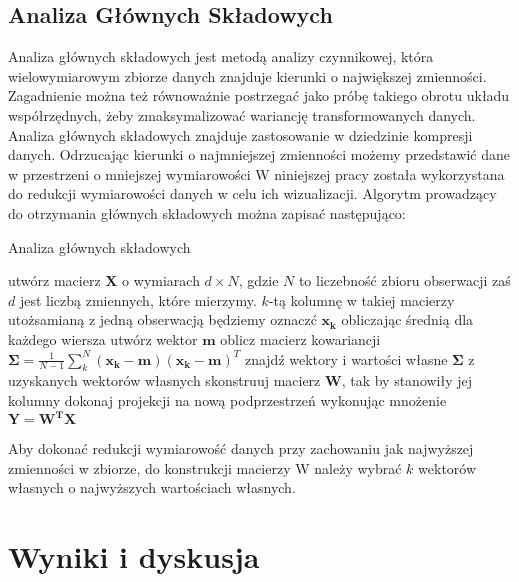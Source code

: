 \documentclass{article}
\begin{document}
\subsection{Analiza Głównych Składowych}
\label{pca_rozdzial}
Analiza głównych składowych jest metodą analizy czynnikowej, która wielowymiarowym zbiorze danych znajduje kierunki o największej zmienności.
Zagadnienie można też równoważnie postrzegać jako próbę takiego obrotu układu współrzędnych, żeby zmaksymalizować wariancję transformowanych danych.
Analiza głównych składowych znajduje zastosowanie w dziedzinie kompresji danych.
Odrzucając kierunki o najmniejszej zmienności możemy przedstawić dane w przestrzeni o mniejszej wymiarowości
W niniejszej pracy została wykorzystana do redukcji wymiarowości danych w celu ich wizualizacji.
Algorytm prowadzący do otrzymania głównych składowych można zapisać następująco:

\begin{algorithm}
\label{pca}
\caption{Analiza głównych składowych}
\begin{algorithmic}[1]
\STATE utwórz macierz $\textbf{X}$ o wymiarach $d \times N$, gdzie $N$ to liczebność zbioru obserwacji zaś $d$ jest liczbą zmiennych, które mierzymy. $k$-tą kolumnę w takiej macierzy utożsamianą z jedną obserwacją będziemy oznaczć $\mathbf{x_k}$
\STATE obliczając średnią dla każdego wiersza utwórz wektor $\textbf{m}$
\STATE oblicz macierz kowariancji $\mathbf{\Sigma} = \frac{1}{N-1}\sum\limits_k^N(\mathbf{x_k - m})(\mathbf{x_k - m})^T$
\STATE znajdź wektory i wartości własne $\mathbf{\Sigma}$
\STATE z uzyskanych wektorów własnych skonstruuj macierz \textbf{W}, tak by stanowiły jej kolumny
\STATE dokonaj projekcji na nową podprzestrzeń wykonując mnożenie $\mathbf{Y = W^TX}$
\end{algorithmic}
\end{algorithm}
Aby dokonać redukcji wymiarowość danych przy zachowaniu jak najwyższej zmienności w zbiorze, do konstrukcji macierzy W należy wybrać $k$ wektorów własnych o najwyższych wartościach własnych.

\section{Wyniki i dyskusja}
\end{document}
